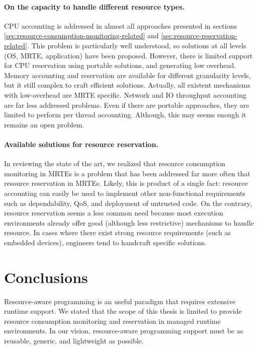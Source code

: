 \paragraph{On the capacity to handle different resource types.}
CPU accounting is addressed in almost all approaches presented in sections \ref{sec:resource-consumption-monitoring-related} and \ref{sec:resource-reservation-related}.
This problem is particularly well understood, so solutions at all levels (OS, MRTE, application) have been proposed.
However, there is limited support for CPU reservation using portable solutions, and generating low overhead.
Memory accounting and reservation are available for different granularity levels, but it still complex to craft efficient solutions.
Actually, all existent mechanisms with low-overhead are MRTE specific.
Network and IO throughput accounting are far less addressed problems.
Even if there are portable approaches, they are limited to perform per thread accounting.
Although, this may seems enough it remains an open problem.

\paragraph{Available solutions for resource reservation.}
In reviewing the state of the art, we realized that resource consumption monitoring in MRTEs is a problem that has been addressed far more often that resource reservation in MRTEs.
Likely, this is product of a single fact: resource accounting can easily be used to implement other non-functional requirements such as dependability, QoS, and deployment of untrusted code.
On the contrary, resource reservation seems a less common need because most execution environments already offer good (although less restrictive) mechanisms to handle resource.
In cases where there exist strong resource requirements (such as embedded devices), engineers tend to handcraft specific solutions.


\section{Conclusions}
Resource-aware programming is an useful paradigm that requires extensive runtime support.
We stated that the scope of this thesis is limited to provide resource consumption monitoring and reservation in managed runtime environments.
In our vision, resource-aware programming support must be as reusable, generic, and lightweight as possible.

